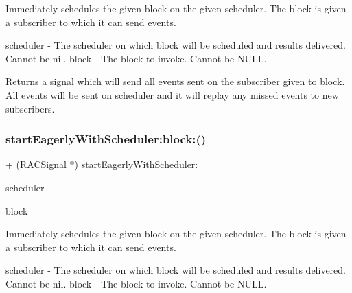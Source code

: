 Immediately schedules the given block on the given scheduler. The block is given a subscriber to which it can send events.

scheduler -\/ The scheduler on which {\ttfamily block} will be scheduled and results delivered. Cannot be nil. block -\/ The block to invoke. Cannot be N\+U\+LL.

Returns a signal which will send all events sent on the subscriber given to {\ttfamily block}. All events will be sent on {\ttfamily scheduler} and it will replay any missed events to new subscribers. \mbox{\label{interface_r_a_c_signal_a6bee49e8a8ee2f41bcec31bb86948b37}} 
\subsubsection{\texorpdfstring{start\+Eagerly\+With\+Scheduler\+:block\+:()}{startEagerlyWithScheduler:block:()}\hspace{0.1cm}{\footnotesize\ttfamily [3/3]}}
{\footnotesize\ttfamily + (\mbox{\hyperlink{interface_r_a_c_signal}{R\+A\+C\+Signal}} $\ast$) start\+Eagerly\+With\+Scheduler\+: \begin{DoxyParamCaption}\item[{(\mbox{\hyperlink{interface_r_a_c_scheduler}{R\+A\+C\+Scheduler}} $\ast$)}]{scheduler }\item[{block:(void($^\wedge$)(id$<$\mbox{\hyperlink{interface_r_a_c_subscriber}{R\+A\+C\+Subscriber}}$>$ subscriber))}]{block }\end{DoxyParamCaption}}

Immediately schedules the given block on the given scheduler. The block is given a subscriber to which it can send events.

scheduler -\/ The scheduler on which {\ttfamily block} will be scheduled and results delivered. Cannot be nil. block -\/ The block to invoke. Cannot be N\+U\+LL.

